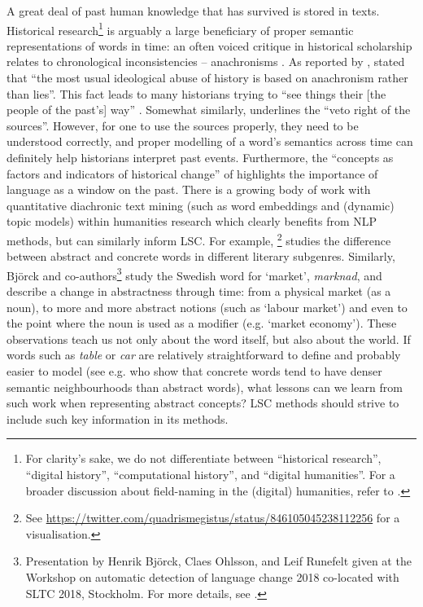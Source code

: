 \documentclass[output=paper]{langscibook}
\begin{document}
A great deal of past human knowledge that has survived is stored in texts.
Historical research\footnote{For clarity's sake, we do not differentiate between  ``historical research'', ``digital history'', ``computational history'', and ``digital humanities''. For a broader discussion about field-naming in the (digital) humanities, refer to \citet{piotrowski_2020}.} is arguably a large beneficiary of proper semantic representations of words in time: an often voiced critique in historical scholarship relates to chronological inconsistencies -- anachronisms \citep{syrjamaki_sins_2011}. 
As reported by \citet{zosa2020disappearing}, \citet{hobsbawm_history_2011} stated that ``the most usual ideological abuse of history is based on anachronism rather than lies''. 
This fact leads to many historians trying to ``see things their [the people of the past's] way'' \citep{skinner_visions_2002}. 
Somewhat similarly, \citet{koselleck_vom_2010} underlines the ``veto right of the sources''. However, for one to use the sources properly, they need to be understood correctly, and proper modelling of a word's semantics across time can definitely help historians interpret past events. 
Furthermore, the ``concepts as factors and indicators of historical change'' of \citet[][80]{koselleck2004futures}  highlights the importance of language as a window on the past.
There is a growing body of work with quantitative diachronic text mining (such as word embeddings and (dynamic) topic models) within humanities research which clearly benefits from NLP methods, but can similarly inform LSC. 
For example, \citet{heuser2017word}\footnote{See \url{https://twitter.com/quadrismegistus/status/846105045238112256} for a visualisation.} studies the difference between abstract and concrete words in different literary subgenres.
Similarly, Björck and co-authors\footnote{Presentation by Henrik Björck, Claes Ohlsson, and Leif Runefelt given at the Workshop on automatic detection of language change 2018 co-located with SLTC 2018, Stockholm. For more details, see \citet{ohlsson2020market}.} study the Swedish word for `market', \emph{marknad}, and describe a change in abstractness through time: from a physical market (as a noun), to more and more abstract notions (such as `labour market') and even to the point where the noun is used as a modifier (e.g. `market economy'). These observations teach us not only about the word itself, but also about the world.
If words such as \emph{table} or \emph{car} are relatively straightforward to define and probably easier to model (see e.g. \citealt{reilly2017effects} who show that concrete words tend to have denser semantic neighbourhoods than abstract words), what lessons can we learn from such work when representing abstract concepts?
LSC methods should strive to include such key information in its methods.
\end{document}
